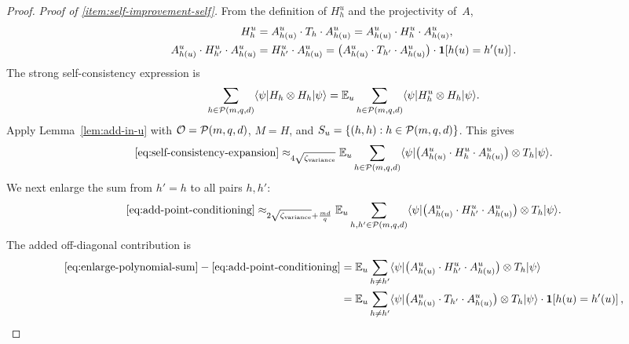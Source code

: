\begin{proof}
  \emph{Proof of \ref{item:self-improvement-self}.}
  From the definition of $H_h^u$ and the projectivity of~$A$,
  \begin{align}
    H^u_h &= A^u_{h(u)} \cdot T_h \cdot A^u_{h(u)} = A^u_{h(u)} \cdot H^u_h \cdot A^u_{h(u)}, \label{eq:h-sandwich}\\
    A^u_{h(u)} \cdot H^u_{h'} \cdot A^u_{h(u)} &= H^u_{h'} \cdot A^u_{h(u)} = \bigl(A^u_{h(u)} \cdot T_{h'} \cdot A^u_{h(u)}\bigr)\cdot \mathbf{1}\!\left[h(u) = h'(u)\right]. \label{eq:h-blt}
  \end{align}
  The strong self-consistency expression is
  \begin{equation}\label{eq:self-consistency-expansion}
    \sum_{h\in\mathcal{P}(m,q,d)} \langle \psi \rvert H_h \otimes H_h \lvert \psi \rangle
    = \mathbb{E}_{u} \sum_{h \in \mathcal{P}(m,q,d)} \langle \psi \rvert H_h^{u} \otimes H_h \lvert \psi \rangle.
  \end{equation}
  Apply Lemma~\ref{lem:add-in-u} with $\mathcal O=\mathcal{P}(m,q,d)$, $M=H$, and $S_u=\{(h,h):h\in\mathcal{P}(m,q,d)\}$. This gives
  \begin{equation}\label{eq:add-point-conditioning}
    \eqref{eq:self-consistency-expansion}
    \approx_{4 \sqrt{\zeta_{\mathrm{variance}}}}
    \mathbb{E}_{u} \sum_{h \in \mathcal{P}(m,q,d)} \langle \psi \rvert \bigl(A^{u}_{h(u)} \cdot H_h^{u} \cdot A^{u}_{h(u)}\bigr) \otimes T_h \lvert \psi \rangle.
  \end{equation}
  We next enlarge the sum from $h'=h$ to all pairs $h,h'$:
  \begin{equation}\label{eq:enlarge-polynomial-sum}
    \eqref{eq:add-point-conditioning}
    \approx_{2\sqrt{\zeta_{\mathrm{variance}}} + \frac{md}{q}}
    \mathbb{E}_{u} \sum_{h, h' \in \mathcal{P}(m,q,d)} \langle \psi \rvert \bigl(A^{u}_{h(u)} \cdot H^{u}_{h'} \cdot A^{u}_{h(u)}\bigr) \otimes T_h \lvert \psi \rangle.
  \end{equation}
  The added off-diagonal contribution is
  \begin{align}
    \eqref{eq:enlarge-polynomial-sum}-\eqref{eq:add-point-conditioning}
    &= \E_{u} \sum_{h \neq h'} \bra{\psi} \bigl(A^{u}_{h(u)} \cdot H^{u}_{h'} \cdot A^{u}_{h(u)}\bigr) \ot T_h \ket{\psi} \notag\\
    &= \E_{u} \sum_{h \neq h'} \bra{\psi} \bigl(A^{u}_{h(u)} \cdot T_{h'} \cdot A^{u}_{h(u)}\bigr) \ot T_h \ket{\psi} \cdot \bone{h(u) = h'(u)}, \label{eq:added-indicator}

\end{align}
\end{proof}
